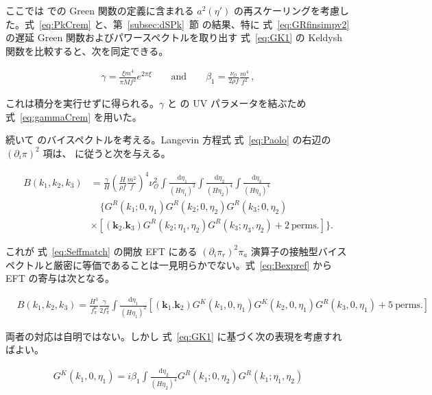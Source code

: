 \documentclass[a4paper,11pt]{ltjsarticle}
\numberwithin{equation}{section}
\def\pia{\pi_{a}}
\def\pir{\pi_{r}}
\newcommand{\dd}{\mathrm{d}}
\newcommand{\ee}{e}
\newcommand{\boldmathsymbol}[1]{{\ensuremath{\boldsymbol{#1}}}}
\newcommand{\bmk}{\boldmathsymbol{k}}
\newcommand{\Eq}[1]{Eq.~(\ref{#1})}
\newcommand{\Sec}[1]{Sec.~\ref{#1}}
\def\bmk{{\boldsymbol{k}}}
\renewcommand{\Eq}[1]{式~\eqref{#1}}
\renewcommand{\Sec}[1]{第~\ref{#1}~節}
\begin{document}
ここでは \cite{Creminelli:2023aly} での Green 関数の定義に含まれる $a^2(\eta')$ の再スケーリングを考慮した。\Eq{eq:PkCrem} と、\Sec{subsec:dSPk} の結果、特に \Eq{eq:GRfinsimpv2} の遅延 Green 関数およびパワースペクトルを取り出す \Eq{eq:GK1} の Keldysh 関数を比較すると、次を同定できる。

\begin{align}\label{eq:match1}
    \gamma = \frac{\xi m^4}{\pi M f^2} \ee^{2 \pi \xi} \qquad \mathrm{and} \qquad \beta_1 = \frac{\nu_{\mathcal{O}}}{2 \rho f} \frac{m^4}{f^2}\,,
\end{align}

これは積分を実行せずに得られる。$\gamma$ と \cite{Creminelli:2023aly} の UV パラメータを結ぶため \Eq{eq:gammaCrem} を用いた。

続いて \cite{Creminelli:2023aly} のバイスペクトルを考える。Langevin 方程式 \Eq{eq:Paolo} の右辺の $(\partial_i\pi)^2$ 項は、\cite{Creminelli:2023aly} に従うと次を与える。

\begin{align}\label{eq:bispecCrem}
     B(k_1,k_2,k_3) &= \frac{\gamma}{H} \left(\frac{H}{\rho f} \frac{m^2}{f} \right)^4 \nu_\mathcal{O}^2  \int \frac{\dd \eta_1}{\left(H\eta_1\right)^{2}} \int \frac{\dd \eta_2}{\left(H\eta_2\right)^{4}}  \int \frac{\dd \eta_3} {\left(H\eta_3\right)^{4}}   \nonumber\\
    & \quad \bigg\{G^R(k_1; 0,\eta_1) G^R(k_2; 0,\eta_2) G^R(k_3; 0,\eta_2) \\
    &\times\left[ \left(\bmk_2.\bmk_3\right) G^R(k_2; \eta_1,\eta_2)  G^R(k_3; \eta_3,\eta_2)+ 2~\mathrm{perms.} \right] \bigg\} .  \nonumber
\end{align}

これが \Eq{eq:Seffmatch} の開放 EFT にある $(\partial_i\pir)^2\pia$ 演算子の接触型バイスペクトルと厳密に等価であることは一見明らかでない。\Eq{eq:Bexpref} から EFT の寄与は次となる。

\begin{align}\label{eq:bspecmatch2}
    &B(k_1,k_2,k_3) = \frac{H^3}{f_\pi^6}  \frac{\gamma}{2f_{\pi}^{2}}  \int \frac{\dd \eta_1}{\left(H\eta_1\right)^{2}} \left[\left(\bmk_1.\bmk_2\right) G^{K}(k_1, 0, \eta_1) G^{K}(k_2, 0, \eta_1) G^R(k_3, 0, \eta_1) + 5~\mathrm{perms}. \right]
\end{align}

両者の対応は自明ではない。しかし \Eq{eq:GK1} に基づく次の表現を考慮すればよい。

\begin{align}
   G^{K}(k_1, 0, \eta_1) =  i \beta_1 \int \frac{\dd \eta_2}{\left(H\eta_2\right)^{4}} G^R(k_1; 0, \eta_2) G^R(k_1; \eta_1,\eta_2) 
\end{align}
\end{document}
